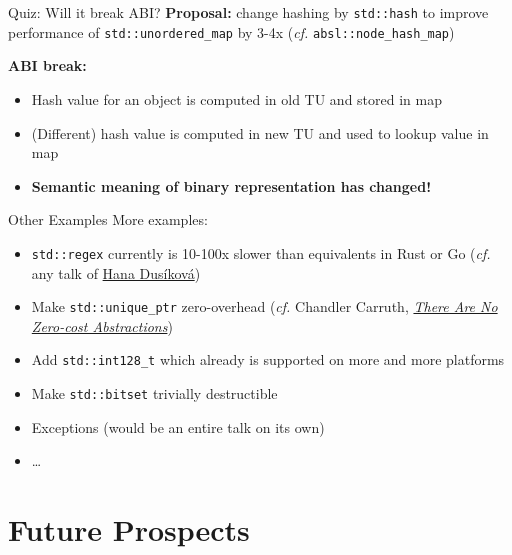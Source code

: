 \begin{frame}{Quiz: Will it break ABI?}
    \textbf{Proposal:} change hashing by \texttt{std::hash} to improve performance of \texttt{std::unordered\_map} by 3-4x (\textit{cf.} \texttt{absl::node\_hash\_map})

    \vspace*{5mm}

    \textcolor{vertexDarkRed}{\textbf{ABI break:}}
    \begin{itemize}
        \item Hash value for an object is computed in old TU and stored in map
        \item (Different) hash value is computed in new TU and used to lookup value in map
        \item \textbf{Semantic meaning of binary representation has changed!}
    \end{itemize}
\end{frame}

\begin{frame}{Other Examples}
    More examples:
    \begin{itemize}
        \item \texttt{std::regex} currently is 10-100x slower than equivalents in Rust or Go (\textit{cf.} any talk of \href{https://youtu.be/8dKWdJzPwHw}{Hana Dusíková})
        \item Make \texttt{std::unique\_ptr} zero-overhead (\textit{cf.} Chandler Carruth, \href{https://youtu.be/rHIkrotSwcc}{\textit{There Are No Zero-cost Abstractions}})
        \item Add \texttt{std::int128\_t} which already is supported on more and more platforms
        \item Make \texttt{std::bitset} trivially destructible
        \item Exceptions (would be an entire talk on its own)
        \item \ldots 
    \end{itemize}

    \centering
\end{frame}

\section{Future Prospects}

